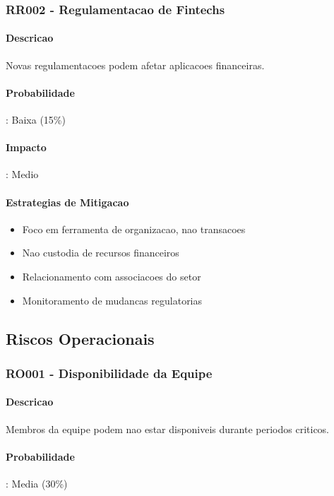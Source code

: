 \subsubsection{RR002 - Regulamentacao de Fintechs}

\paragraph{Descricao}
Novas regulamentacoes podem afetar aplicacoes financeiras.

\paragraph{Probabilidade}: Baixa (15\%)
\paragraph{Impacto}: Medio

\paragraph{Estrategias de Mitigacao}
\begin{itemize}
    \item Foco em ferramenta de organizacao, nao transacoes
    \item Nao custodia de recursos financeiros
    \item Relacionamento com associacoes do setor
    \item Monitoramento de mudancas regulatorias
\end{itemize}

\subsection{Riscos Operacionais}

\subsubsection{RO001 - Disponibilidade da Equipe}

\paragraph{Descricao}
Membros da equipe podem nao estar disponiveis durante periodos criticos.

\paragraph{Probabilidade}: Media (30\%)
